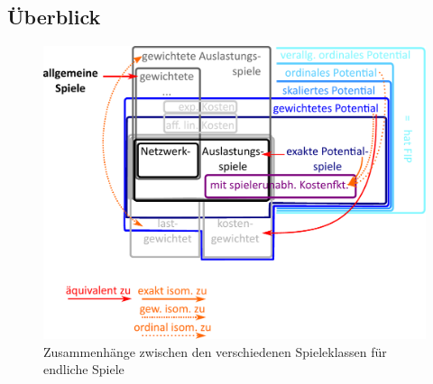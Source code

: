 \subsection{Überblick}

\begin{figure}[h]\centering
	\includegraphics[width=.7\textwidth]{../Bilder/VennDiagramm.pdf}
	\caption{Zusammenhänge zwischen den verschiedenen Spieleklassen für endliche Spiele}
\end{figure}